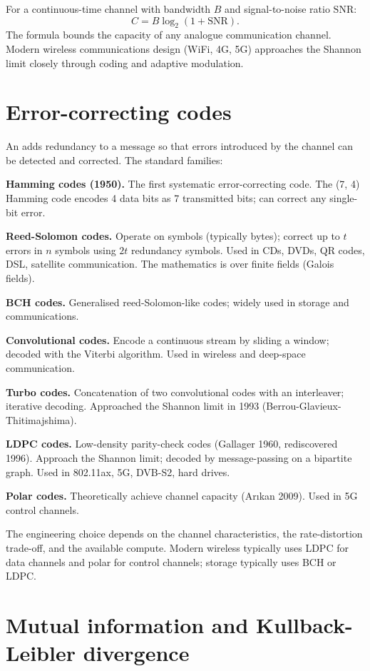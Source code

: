 For a continuous-time channel with bandwidth $B$ and signal-to-noise ratio $\mathrm{SNR}$:
\[
C = B \log_2(1 + \mathrm{SNR}).
\]
The formula bounds the capacity of any analogue communication channel. Modern wireless communications design (WiFi, 4G, 5G) approaches the Shannon limit closely through coding and adaptive modulation.

\section{Error-correcting codes}

An  adds redundancy to a message so that errors introduced by the channel can be detected and corrected. The standard families:

\textbf{Hamming codes (1950).} The first systematic error-correcting code. The (7, 4) Hamming code encodes 4 data bits as 7 transmitted bits; can correct any single-bit error.

\textbf{Reed-Solomon codes.} Operate on symbols (typically bytes); correct up to $t$ errors in $n$ symbols using $2t$ redundancy symbols. Used in CDs, DVDs, QR codes, DSL, satellite communication. The mathematics is over finite fields (Galois fields).

\textbf{BCH codes.} Generalised reed-Solomon-like codes; widely used in storage and communications.

\textbf{Convolutional codes.} Encode a continuous stream by sliding a window; decoded with the Viterbi algorithm. Used in wireless and deep-space communication.

\textbf{Turbo codes.} Concatenation of two convolutional codes with an interleaver; iterative decoding. Approached the Shannon limit in 1993 (Berrou-Glavieux-Thitimajshima).

\textbf{LDPC codes.} Low-density parity-check codes (Gallager 1960, rediscovered 1996). Approach the Shannon limit; decoded by message-passing on a bipartite graph. Used in 802.11ax, 5G, DVB-S2, hard drives.

\textbf{Polar codes.} Theoretically achieve channel capacity (Ar{\i}kan 2009). Used in 5G control channels.

The engineering choice depends on the channel characteristics, the rate-distortion trade-off, and the available compute. Modern wireless typically uses LDPC for data channels and polar for control channels; storage typically uses BCH or LDPC.

\section{Mutual information and Kullback-Leibler divergence}

